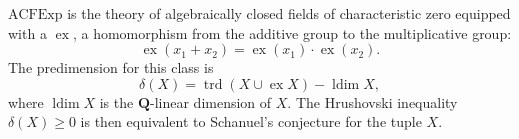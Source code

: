 $\mathrm{ACFExp}$ is the theory of algebraically closed fields of characteristic zero equipped with a  $\operatorname{ex}$, a homomorphism from the additive group to the multiplicative group:
$$\operatorname{ex}(x_1 + x_2) = \operatorname{ex}(x_1) \cdot \operatorname{ex}(x_2).$$
The predimension for this class is
$$\delta(X) = \operatorname{trd}(X \cup \operatorname{ex} X) - \operatorname{ldim} X,$$
where $\operatorname{ldim} X$ is the $\mathbf{Q}$-linear dimension of $X$. The Hrushovski inequality $\delta(X) \geq 0$ is then equivalent to Schanuel's conjecture for the tuple $X$.

